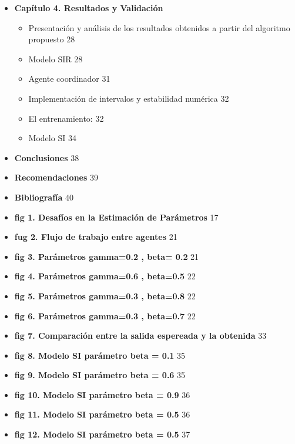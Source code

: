 \begin{itemize}
\item \textbf{ Capítulo 4. Resultados y Validación}
\begin{itemize}
    \item Presentación y análisis de los resultados obtenidos a partir del
    algoritmo propuesto \hfill 28
    \item Modelo SIR \hfill 28
    \item Agente coordinador \hfill 31
    \item Implementación de intervalos y estabilidad numérica \hfill 32
    \item El entrenamiento: \hfill 32
    \item Modelo SI \hfill 34
\end{itemize}

\item \textbf{ Conclusiones} \hfill 38
\item \textbf{ Recomendaciones} \hfill 39
\item \textbf{ Bibliografía} \hfill 40


\end{itemize}

\listoffigures

\begin{itemize}
\item  \textbf{fig 1. Desafíos en la Estimación de Parámetros} \hfill 17
\item  \textbf{fug 2. Flujo de trabajo entre agentes} \hfill 21
\item  \textbf{fig 3.  Parámetros gamma=0.2 , beta= 0.2} \hfill 21
\item  \textbf{fig 4. Parámetros gamma=0.6 , beta=0.5 } \hfill 22
\item  \textbf{fig 5.  Parámetros gamma=0.3 , beta=0.8 } \hfill 22
\item  \textbf{fig 6. Parámetros gamma=0.3 , beta=0.7 } \hfill 22
\item  \textbf{fig 7. Comparación entre la salida espereada y la obtenida } \hfill 33
\item  \textbf{fig 8.  Modelo SI parámetro beta = 0.1 } \hfill 35
\item  \textbf{fig 9.  Modelo SI parámetro beta = 0.6 } \hfill 35
\item  \textbf{fig 10.  Modelo SI parámetro beta = 0.9 } \hfill 36
\item  \textbf{fig 11.  Modelo SI parámetro beta = 0.5 } \hfill 36
\item  \textbf{fig 12.  Modelo SI parámetro beta = 0.5 } \hfill 37


\end{itemize}

